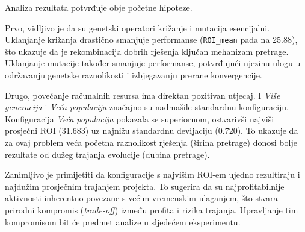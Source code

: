 Analiza rezultata potvrđuje obje početne hipoteze. 

Prvo, vidljivo je da su genetski operatori križanje i mutacija esencijalni. Uklanjanje križanja drastično smanjuje performanse (\texttt{ROI\_mean} pada na 25.88), što ukazuje da je rekombinacija dobrih rješenja ključan mehanizam pretrage. Uklanjanje mutacije također smanjuje performanse, potvrđujući njezinu ulogu u održavanju genetske raznolikosti i izbjegavanju prerane konvergencije.

Drugo, povećanje računalnih resursa ima direktan pozitivan utjecaj. I \emph{Više generacija} i \emph{Veća populacija} značajno su nadmašile standardnu konfiguraciju. Konfiguracija \emph{Veća populacija} pokazala se superiornom, ostvarivši najviši prosječni ROI (31.683) uz najnižu standardnu devijaciju (0.720). To ukazuje da za ovaj problem veća početna raznolikost rješenja (širina pretrage) donosi bolje rezultate od dužeg trajanja evolucije (dubina pretrage).

Zanimljivo je primijetiti da konfiguracije s najvišim ROI-em ujedno rezultiraju i najdužim prosječnim trajanjem projekta. To sugerira da su najprofitabilnije aktivnosti inherentno povezane s većim vremenskim ulaganjem, što stvara prirodni kompromis (\emph{trade-off}) između profita i rizika trajanja. Upravljanje tim kompromisom bit će predmet analize u sljedećem eksperimentu.


